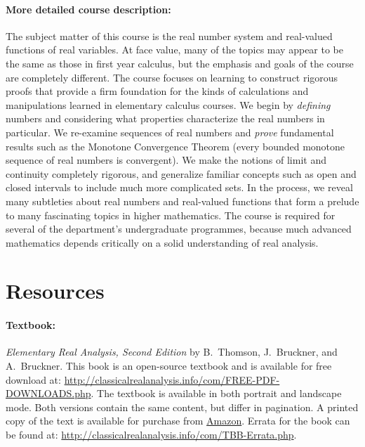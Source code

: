 \documentclass[12pt]{article}
\begin{document}
\paragraph*{More detailed course description:} 

The subject matter of this course is the real number system and real-valued functions of real variables. At face value, many of the topics may appear to be the same as those in first year calculus, but the emphasis and goals of the course are completely different.  The course focuses on learning to construct rigorous proofs that provide a firm foundation for the kinds of calculations and manipulations learned in elementary calculus courses.  We begin by \emph{defining} numbers and considering what properties characterize the real numbers in particular.  We re-examine sequences of real numbers and \emph{prove} fundamental results such as the Monotone Convergence Theorem (every bounded monotone sequence of real numbers is convergent).  We make the notions of limit and continuity completely rigorous, and generalize familiar concepts such as open and closed intervals to include much more complicated sets.  In the process, we reveal many subtleties about real numbers and real-valued functions that form a prelude to many fascinating topics in higher mathematics.  The course is required for several of the department's undergraduate programmes, because much advanced mathematics depends critically on a solid understanding of real analysis.

\section*{Resources}

\paragraph*{Textbook: } \emph{Elementary Real Analysis, Second Edition} by B.\ Thomson, J.\ Bruckner, and A.\ Bruckner.  This book is an open-source textbook and is available for free download at: \url{http://classicalrealanalysis.info/com/FREE-PDF-DOWNLOADS.php}.  The textbook is available in both portrait and landscape mode.  Both versions contain the same content, but differ in pagination.  A printed copy of the text is available for purchase from \href{https://www.amazon.ca/Elementary-Real-Analysis-Brian-Thomson/dp/143484367X/}{Amazon}.  Errata for the book can be found at: \url{http://classicalrealanalysis.info/com/TBB-Errata.php}.
\end{document}
